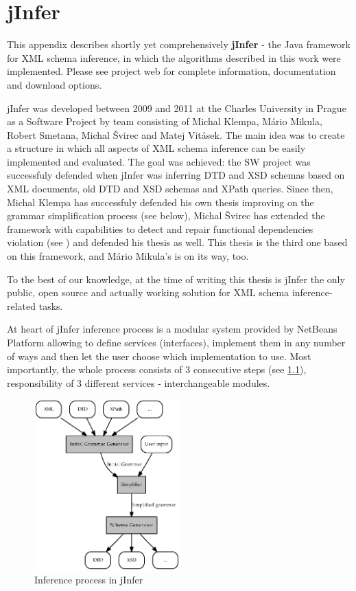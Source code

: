 \chapter{jInfer}
\label{appendix-jInfer}

This appendix describes shortly yet comprehensively \textbf{jInfer} - the Java framework for XML schema inference, in which the algorithms described in this work were implemented. Please see project web \cite{jinferweb} for complete information, documentation and download options.

jInfer was developed between 2009 and 2011 at the Charles University in Prague as a Software Project by team consisting of Michal Klempa, Mário Mikula, Ro\-bert Sme\-ta\-na, Michal Švirec and Matej Vitásek. The main idea was to create a structure in which all aspects of XML schema inference can be easily implemented and evaluated. The goal was achieved: the SW project was successfuly defended when jInfer was inferring DTD and XSD schemas based on XML documents, old DTD and XSD schemas and XPath queries. Since then, Michal Klempa has successfuly defended his own thesis improving on the grammar simplification process (see below), Michal Švirec has extended the framework with capabilities to detect and repair functional dependencies violation (see \cite{sviro}) and defended his thesis as well. This thesis is the third one based on this framework, and Mário Mikula's is on its way, too.

To the best of our knowledge, at the time of writing this thesis is jInfer the only public, open source and actually working solution for XML schema inference-related tasks.

At heart of jInfer inference process is a modular system provided by NetBeans Platform allowing to define services (interfaces), implement them in any number of ways and then let the user choose which implementation to use. Most importantly, the whole process consists of 3 consecutive steps (see \ref{image-inference-process}), responsibility of 3 different services - interchangeable modules.

\begin{figure}
  \caption{Inference process in jInfer}
  \vspace{10pt}
  \label{image-inference-process}
  \centering
    \includegraphics[width=0.5\textwidth]{images/inference-process}
\end{figure}

